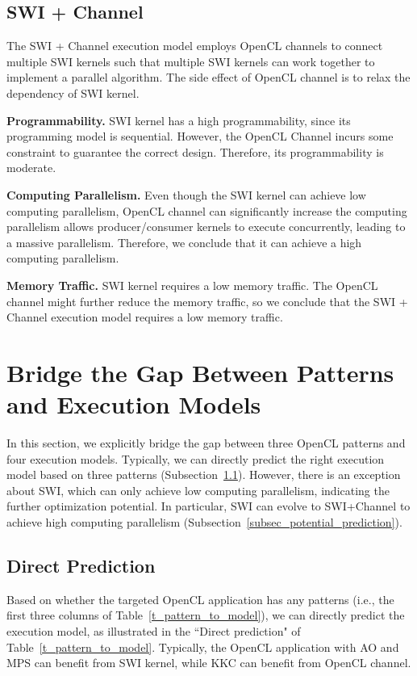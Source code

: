 \vspace{-1ex}
\subsection{SWI + Channel }
The SWI + Channel execution model employs OpenCL channels to connect multiple SWI kernels such that multiple SWI kernels can work together to implement a parallel algorithm. The side effect of OpenCL channel is to relax the dependency of SWI kernel.  

{\bf Programmability. }SWI kernel has a high programmability, since its programming model is sequential. However, the OpenCL Channel incurs some constraint to guarantee the correct design. Therefore, its programmability is moderate.

{\bf Computing Parallelism. }Even though the SWI kernel can achieve low computing parallelism, OpenCL channel can significantly increase the computing parallelism allows producer/consumer kernels to execute concurrently, leading to a massive parallelism. Therefore, we conclude that it can achieve a high computing parallelism.  

{\bf Memory Traffic. }SWI kernel requires a low memory traffic. The OpenCL channel might further reduce the memory traffic, so we conclude that the SWI + Channel execution model requires a low memory traffic. 



\vspace{-1ex}
\section{Bridge the Gap Between Patterns and Execution Models}%
\label{sec_bridge_gap}
In this section, we explicitly bridge the gap between three OpenCL patterns and four execution models. Typically, we can directly predict the right execution model based on three patterns (Subsection~\ref{subsec_direct_prediction}). However, there is an exception about SWI, which can only achieve low computing parallelism, indicating the further optimization potential. In particular, SWI can evolve to SWI+Channel to achieve high computing parallelism (Subsection~\ref{subsec_potential_prediction}).  

\vspace{-1ex}
\subsection{Direct Prediction}
\label{subsec_direct_prediction}
Based on whether the targeted OpenCL application has any patterns (i.e., the first three columns of Table~\ref{t_pattern_to_model}), we can directly predict the execution model, as illustrated in the ``Direct prediction" of Table~\ref{t_pattern_to_model}. Typically, the OpenCL application with AO and MPS can benefit from SWI kernel, while KKC can benefit from OpenCL channel.%
\vspace{-1ex}

